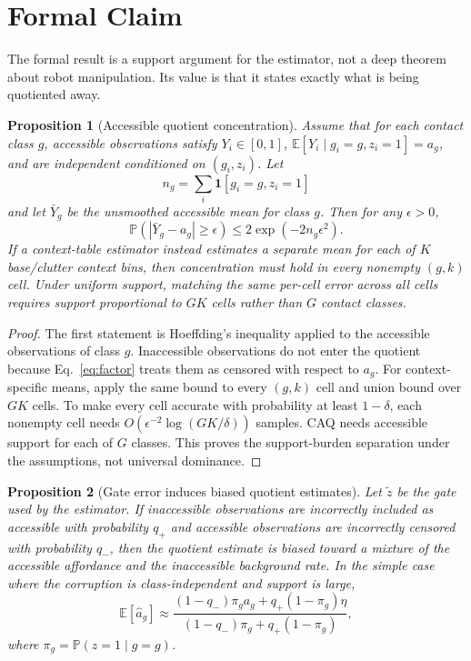 \documentclass{article}
\newtheorem{proposition}{Proposition}
\newcommand{\gate}{z}
\newcommand{\aff}{a}
\newcommand{\class}{g}
\newcommand{\Expect}{\mathbb{E}}
\newcommand{\Prob}{\mathbb{P}}
\newcommand{\ind}{\mathbf{1}}
\begin{document}
\section{Formal Claim}

The formal result is a support argument for the estimator, not a deep theorem about robot manipulation. Its value is that it states exactly what is being quotiented away.

\begin{proposition}[Accessible quotient concentration]
Assume that for each contact class $g$, accessible observations satisfy $Y_i\in[0,1]$, $\Expect[Y_i\mid \class_i=g,\gate_i=1]=\aff_g$, and are independent conditioned on $(\class_i,\gate_i)$. Let
\[
    n_g=\sum_i \ind[\class_i=g,\gate_i=1]
\]
and let $\bar{Y}_g$ be the unsmoothed accessible mean for class $g$. Then for any $\epsilon>0$,
\begin{equation}
    \Prob\left(|\bar{Y}_g-\aff_g|\geq \epsilon\right)
    \leq
    2\exp(-2n_g\epsilon^2).
    \label{eq:hoeffding}
\end{equation}
If a context-table estimator instead estimates a separate mean for each of $K$ base/clutter context bins, then concentration must hold in every nonempty $(g,k)$ cell. Under uniform support, matching the same per-cell error across all cells requires support proportional to $GK$ cells rather than $G$ contact classes.
\end{proposition}

\begin{proof}
The first statement is Hoeffding's inequality applied to the accessible observations of class $g$. Inaccessible observations do not enter the quotient because Eq.~\ref{eq:factor} treats them as censored with respect to $\aff_g$. For context-specific means, apply the same bound to every $(g,k)$ cell and union bound over $GK$ cells. To make every cell accurate with probability at least $1-\delta$, each nonempty cell needs $O(\epsilon^{-2}\log(GK/\delta))$ samples. CAQ needs accessible support for each of $G$ classes. This proves the support-burden separation under the assumptions, not universal dominance.
\end{proof}

\begin{proposition}[Gate error induces biased quotient estimates]
Let $\tilde{\gate}$ be the gate used by the estimator. If inaccessible observations are incorrectly included as accessible with probability $q_+$ and accessible observations are incorrectly censored with probability $q_-$, then the quotient estimate is biased toward a mixture of the accessible affordance and the inaccessible background rate. In the simple case where the corruption is class-independent and support is large,
\begin{equation}
    \Expect[\hat{\aff}_g]
    \approx
    \frac{(1-q_-)\pi_g \aff_g + q_+(1-\pi_g)\eta}
    {(1-q_-)\pi_g + q_+(1-\pi_g)},
    \label{eq:gatebias}
\end{equation}
where $\pi_g=\Prob(\gate=1\mid \class=g)$.
\end{proposition}
\end{document}
